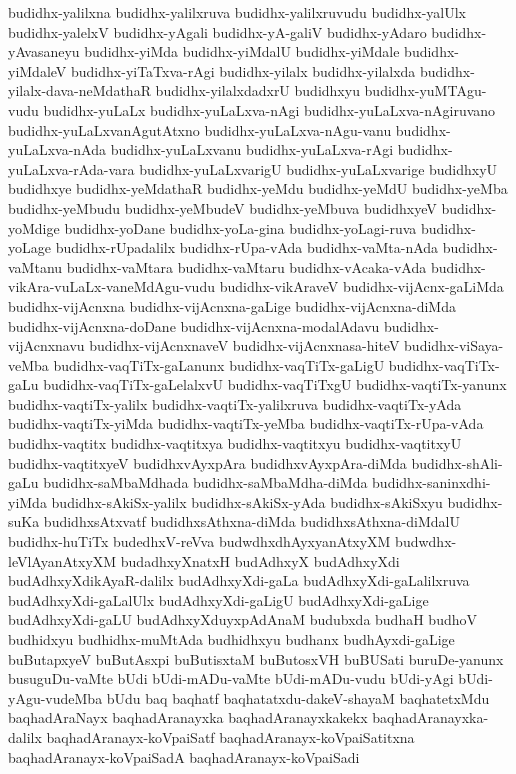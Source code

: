 {budidhx-yalilxna
budidhx-yalilxruva
budidhx-yalilxruvudu
budidhx-yalUlx
budidhx-yalelxV
budidhx-yAgali
budidhx-yA-galiV
budidhx-yAdaro
budidhx-yAvasaneyu
budidhx-yiMda
budidhx-yiMdalU
budidhx-yiMdale
budidhx-yiMdaleV
budidhx-yiTaTxva-rAgi
budidhx-yilalx
budidhx-yilalxda
budidhx-yilalx-dava-neMdathaR
budidhx-yilalxdadxrU
budidhxyu
budidhx-yuMTAgu-vudu
budidhx-yuLaLx
budidhx-yuLaLxva-nAgi
budidhx-yuLaLxva-nAgiruvano
budidhx-yuLaLxvanAgutAtxno
budidhx-yuLaLxva-nAgu-vanu
budidhx-yuLaLxva-nAda
budidhx-yuLaLxvanu
budidhx-yuLaLxva-rAgi
budidhx-yuLaLxva-rAda-vara
budidhx-yuLaLxvarigU
budidhx-yuLaLxvarige
budidhxyU
budidhxye
budidhx-yeMdathaR
budidhx-yeMdu
budidhx-yeMdU
budidhx-yeMba
budidhx-yeMbudu
budidhx-yeMbudeV
budidhx-yeMbuva
budidhxyeV
budidhx-yoMdige
budidhx-yoDane
budidhx-yoLa-gina
budidhx-yoLagi-ruva
budidhx-yoLage
budidhx-rUpadalilx
budidhx-rUpa-vAda
budidhx-vaMta-nAda
budidhx-vaMtanu
budidhx-vaMtara
budidhx-vaMtaru
budidhx-vAcaka-vAda
budidhx-vikAra-vuLaLx-vaneMdAgu-vudu
budidhx-vikAraveV
budidhx-vijAcnx-gaLiMda
budidhx-vijAcnxna
budidhx-vijAcnxna-gaLige
budidhx-vijAcnxna-diMda
budidhx-vijAcnxna-doDane
budidhx-vijAcnxna-modalAdavu
budidhx-vijAcnxnavu
budidhx-vijAcnxnaveV
budidhx-vijAcnxnasa-hiteV
budidhx-viSaya-veMba
budidhx-vaqTiTx-gaLanunx
budidhx-vaqTiTx-gaLigU
budidhx-vaqTiTx-gaLu
budidhx-vaqTiTx-gaLelalxvU
budidhx-vaqTiTxgU
budidhx-vaqtiTx-yanunx
budidhx-vaqtiTx-yalilx
budidhx-vaqtiTx-yalilxruva
budidhx-vaqtiTx-yAda
budidhx-vaqtiTx-yiMda
budidhx-vaqtiTx-yeMba
budidhx-vaqtiTx-rUpa-vAda
budidhx-vaqtitx
budidhx-vaqtitxya
budidhx-vaqtitxyu
budidhx-vaqtitxyU
budidhx-vaqtitxyeV
budidhxvAyxpAra
budidhxvAyxpAra-diMda
budidhx-shAli-gaLu
budidhx-saMbaMdhada
budidhx-saMbaMdha-diMda
budidhx-saninxdhi-yiMda
budidhx-sAkiSx-yalilx
budidhx-sAkiSx-yAda
budidhx-sAkiSxyu
budidhx-suKa
budidhxsAtxvatf
budidhxsAthxna-diMda
budidhxsAthxna-diMdalU
budidhx-huTiTx
budedhxV-reVva
budwdhxdhAyxyanAtxyXM
budwdhx-leVlAyanAtxyXM
budadhxyXnatxH
budAdhxyX
budAdhxyXdi
budAdhxyXdikAyaR-dalilx
budAdhxyXdi-gaLa
budAdhxyXdi-gaLalilxruva
budAdhxyXdi-gaLalUlx
budAdhxyXdi-gaLigU
budAdhxyXdi-gaLige
budAdhxyXdi-gaLU
budAdhxyXduyxpAdAnaM
budubxda
budhaH
budhoV
budhidxyu
budhidhx-muMtAda
budhidhxyu
budhanx
budhAyxdi-gaLige
buButapxyeV
buButAsxpi
buButisxtaM
buButosxVH
buBUSati
buruDe-yanunx
busuguDu-vaMte
bUdi
bUdi-mADu-vaMte
bUdi-mADu-vudu
bUdi-yAgi
bUdi-yAgu-vudeMba
bUdu
baq
baqhatf
baqhatatxdu-dakeV-shayaM
baqhatetxMdu
baqhadAraNayx
baqhadAranayxka
baqhadAranayxkakekx
baqhadAranayxka-dalilx
baqhadAranayx-koVpaiSatf
baqhadAranayx-koVpaiSatitxna
baqhadAranayx-koVpaiSadA
baqhadAranayx-koVpaiSadi
}
